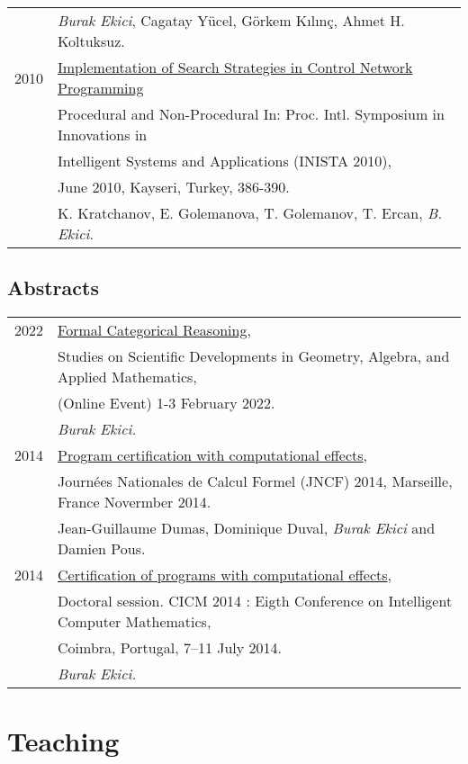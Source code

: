 \documentclass[a4paper,9pt]{article} %
\begin{document}
\begin{longtable}{ll}
& \emph{Burak Ekici}, Cagatay Yücel, Görkem Kılınç, Ahmet H. Koltuksuz.
 \\[0.20cm]
2010 & \href{http://arxiv.org/abs/1412.4184}{Implementation of Search Strategies in Control Network Programming}\\\
& {Procedural and Non-Procedural In: Proc. Intl. Symposium in Innovations in} \\
&{Intelligent Systems and Applications (INISTA 2010),}\\
& {June 2010, Kayseri, Turkey, 386-390.}\\
 & K. Kratchanov, E. Golemanova, T. Golemanov, T. Ercan, \emph{B. Ekici}.
\end{longtable}

\subsection*{Abstracts}
\begin{longtable}{ll}	
2022 &
\href{https://www.researchgate.net/profile/Rashid-Abu-Dawwas/publication/359082788_On_Graded_1-Absorbing_Primary_Ideals/links/6227168c97401151d206310f/On-Graded-1-Absorbing-Primary-Ideals.pdf#page=52}{Formal Categorical Reasoning},\\
& Studies on Scientific Developments in Geometry, Algebra, and Applied
Mathematics,\\
&(Online Event) 1-3 February 2022.\\
& \emph{Burak Ekici.}
 \\[0.20cm]
2014 &
\href{http://arxiv.org/abs/1411.7140}{Program certification with computational effects},\\
& {Journées Nationales de Calcul Formel (JNCF) 2014, Marseille, France Novermber 2014.}\\
& Jean-Guillaume Dumas, Dominique Duval, \emph{Burak Ekici} and Damien Pous.
\\[0.25cm]
2014 &
\href{http://arxiv.org/abs/1411.7139}{Certification of programs with computational effects},\\
& Doctoral session. CICM 2014 : Eigth Conference on Intelligent Computer Mathematics,\\
& Coimbra, Portugal, 7--11 July 2014.\\
&   \emph{Burak Ekici.}
\end{longtable}


\section*{Teaching}
\end{document}
